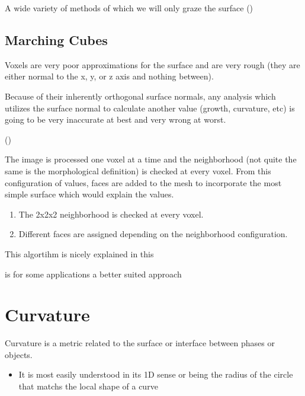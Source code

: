 \documentclass[letterpaper,10pt,english]{sphinxmanual}
\begin{document}
\sphinxAtStartPar
A wide variety of methods of which we will only graze the surface ()


\section{Marching Cubes}
\label{\detokenize{06-AdvancedShapeAndTexture:marching-cubes}}
\sphinxAtStartPar
{}

\sphinxAtStartPar
Voxels are very poor approximations for the surface and are very rough (they are either normal to the x, y, or z axis and nothing between).

\sphinxAtStartPar
Because of their inherently orthogonal surface normals, any analysis which utilizes the surface normal to calculate another value (growth, curvature, etc) is going to be very inaccurate at best and very wrong at worst.



\sphinxAtStartPar
{} ()

\sphinxAtStartPar
The image is processed one voxel at a time and the neighborhood (not quite the same is the morphological definition) is checked at every voxel. From this configuration of values, faces are added to the mesh to incorporate the most simple surface which would explain the values.
\begin{enumerate}
%
\item {} 
\sphinxAtStartPar
The 2x2x2 neighborhood is checked at every voxel.

\item {} 
\sphinxAtStartPar
Different faces are assigned depending on the neighborhood configuration.

\end{enumerate}

\sphinxAtStartPar
This algortihm is nicely explained in this 

\sphinxAtStartPar
{} is for some applications a better suited approach


\chapter{Curvature}
\label{\detokenize{06-AdvancedShapeAndTexture:curvature}}
\sphinxAtStartPar
Curvature is a metric related to the surface or interface between phases or objects.
\begin{itemize}
\item {} 
\sphinxAtStartPar
It is most easily understood in its 1D sense or being the radius of the circle that matchs the local shape of a curve

\end{itemize}
\end{document}

